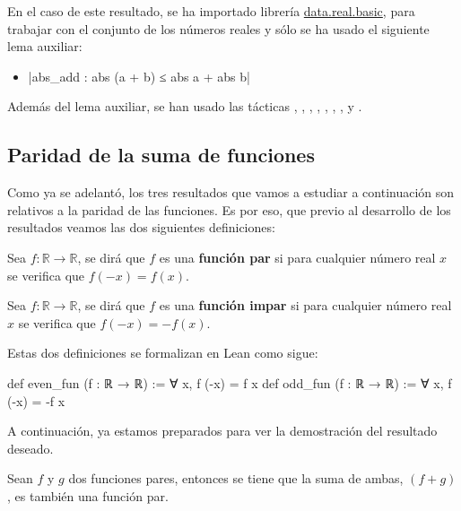 En el caso de este resultado, se ha importado librería
\href{https://github.com/leanprover-community/mathlib/blob/master/src/data/real/basic.lean}{data.real.basic},
para trabajar con el conjunto de los números reales y sólo se ha usado el siguiente
lema auxiliar:
\begin{itemize}
\item {}|abs_add : abs (a + b) ≤ abs a + abs b|
\end{itemize}

Además del lema auxiliar, se han usado las tácticas
,
,
,
,
,
,
,
 y
.

\subsection{Paridad de la suma de funciones}

Como ya se adelantó, los tres resultados que vamos a estudiar a
continuación son relativos a la paridad de las funciones. Es por eso,
que previo al desarrollo de los resultados veamos las dos siguientes
definiciones:

\begin{definicion}\label{funpar}
  Sea \(f: ℝ → ℝ\), se dirá que \(f\) es una \textbf{función par} si
  para cualquier número real \(x\) se verifica que \(f(-x)=f(x)\).
\end{definicion}

\begin{definicion}\label{funimpar}
  Sea \(f: ℝ → ℝ\), se dirá que \(f\) es una \textbf{función impar} si
  para cualquier número real \(x\) se verifica que \(f(-x)=-f(x)\).
\end{definicion}

Estas dos definiciones se formalizan en Lean como sigue:
\begin{leancode}
def even_fun (f : ℝ → ℝ) := ∀ x, f (-x) = f x
def odd_fun  (f : ℝ → ℝ) := ∀ x, f (-x) = -f x
\end{leancode}

A continuación, ya estamos preparados para ver la demostración del
resultado deseado.

\begin{teorema}
  Sean \(f\) y \(g\) dos funciones pares, entonces
  se tiene que la suma de ambas, \((f+g)\), es también una función par.
\end{teorema}

